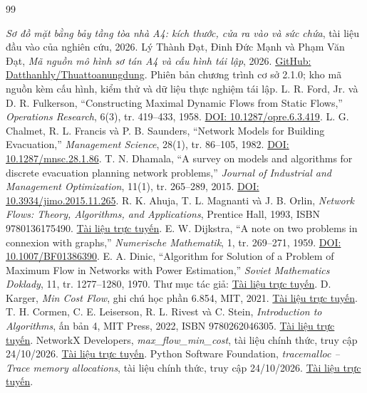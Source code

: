 \clearpage{}
\begingroup\fontsize{12}{17}\selectfont
\begin{thebibliography}{99}\raggedright
{} \emph{Sơ đồ mặt bằng bảy tầng tòa nhà A4: kích thước, cửa ra vào và sức chứa}, tài liệu đầu vào của nghiên cứu, 2026.
 Lý Thành Đạt, Đinh Đức Mạnh và Phạm Văn Đạt, \emph{Mã nguồn mô hình sơ tán A4 và cấu hình tái lập}, 2026. \href{https://github.com/Datthanhly/Thuattoanungdung}{GitHub: Datthanhly/Thuattoanungdung}. Phiên bản chương trình cơ sở 2.1.0; kho mã nguồn kèm cấu hình, kiểm thử và dữ liệu thực nghiệm tái lập.
 L. R. Ford, Jr. và D. R. Fulkerson, ``Constructing Maximal Dynamic Flows from Static Flows,'' \emph{Operations Research}, 6(3), tr. 419--433, 1958. \href{https://doi.org/10.1287/opre.6.3.419}{DOI: 10.1287/opre.6.3.419}.
 L. G. Chalmet, R. L. Francis và P. B. Saunders, ``Network Models for Building Evacuation,'' \emph{Management Science}, 28(1), tr. 86--105, 1982. \href{https://doi.org/10.1287/mnsc.28.1.86}{DOI: 10.1287/mnsc.28.1.86}.
 T. N. Dhamala, ``A survey on models and algorithms for discrete evacuation planning network problems,'' \emph{Journal of Industrial and Management Optimization}, 11(1), tr. 265--289, 2015. \href{https://doi.org/10.3934/jimo.2015.11.265}{DOI: 10.3934/jimo.2015.11.265}.
 R. K. Ahuja, T. L. Magnanti và J. B. Orlin, \emph{Network Flows: Theory, Algorithms, and Applications}, Prentice Hall, 1993, ISBN 9780136175490. \href{https://www.pearson.com/en-us/subject-catalog/p/P200000003456/9780136175490}{Tài liệu trực tuyến}.
 E. W. Dijkstra, ``A note on two problems in connexion with graphs,'' \emph{Numerische Mathematik}, 1, tr. 269--271, 1959. \href{https://doi.org/10.1007/BF01386390}{DOI: 10.1007/BF01386390}.
 E. A. Dinic, ``Algorithm for Solution of a Problem of Maximum Flow in Networks with Power Estimation,'' \emph{Soviet Mathematics Doklady}, 11, tr. 1277--1280, 1970. Thư mục tác giả: \href{https://www.cs.bgu.ac.il/~dinitz/pub.html}{Tài liệu trực tuyến}.
 D. Karger, \emph{Min Cost Flow}, ghi chú học phần 6.854, MIT, 2021. \href{https://courses.csail.mit.edu/6.854/21/Notes/n10-mincostflow.html}{Tài liệu trực tuyến}.
 T. H. Cormen, C. E. Leiserson, R. L. Rivest và C. Stein, \emph{Introduction to Algorithms}, ấn bản 4, MIT Press, 2022, ISBN 9780262046305. \href{https://mitpress.mit.edu/9780262046305/introduction-to-algorithms/}{Tài liệu trực tuyến}.
 NetworkX Developers, \emph{max\_flow\_min\_cost}, tài liệu chính thức, truy cập 24/10/2026. \href{https://networkx.org/documentation/stable/reference/algorithms/generated/networkx.algorithms.flow.max_flow_min_cost.html}{Tài liệu trực tuyến}.
 Python Software Foundation, \emph{tracemalloc -- Trace memory allocations}, tài liệu chính thức, truy cập 24/10/2026. \href{https://docs.python.org/3/library/tracemalloc.html}{Tài liệu trực tuyến}.
\end{thebibliography}\endgroup
